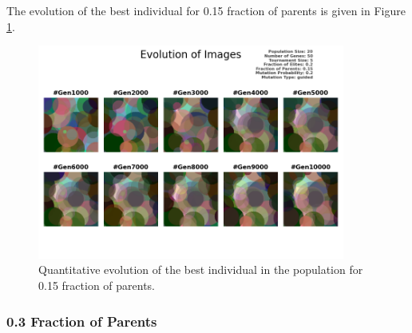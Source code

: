 \documentclass{assignment}
\begin{document}
The evolution of the best individual for 0.15 fraction of parents is given in Figure \ref{fig:0.15parents_image}.

\begin{figure}[!htb]
    \centering
    \includegraphics[width=0.9\textwidth]{figures/images_output_20_50_5_0.2_0.15_0.2_guided.png}
    \caption{Quantitative evolution of the best individual in the population for 0.15 fraction of parents.}
    \label{fig:0.15parents_image}
\end{figure}

\subsubsection{0.3 Fraction of Parents}
\end{document}
